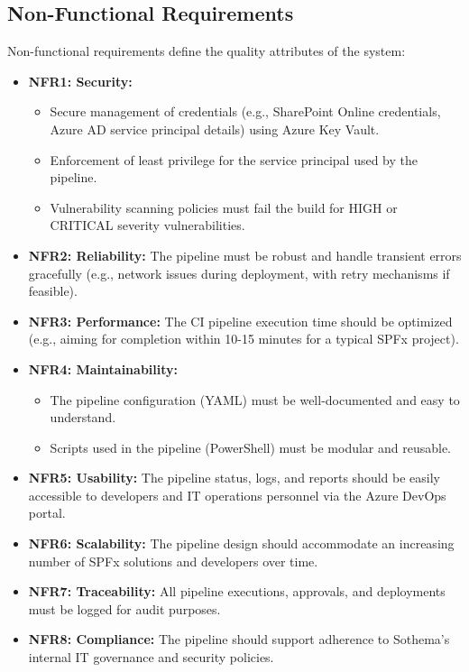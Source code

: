 \subsection{Non-Functional Requirements}
\label{subsec:NonFunctionalRequirements}

Non-functional requirements define the quality attributes of the system:
\begin{itemize}
    \item \textbf{NFR1: Security:}
    \begin{itemize}
        \item Secure management of credentials (e.g., SharePoint Online credentials, Azure AD service principal details) using Azure Key Vault.
        \item Enforcement of least privilege for the service principal used by the pipeline.
        \item Vulnerability scanning policies must fail the build for HIGH or CRITICAL severity vulnerabilities.
    \end{itemize}
    \item \textbf{NFR2: Reliability:} The pipeline must be robust and handle transient errors gracefully (e.g., network issues during deployment, with retry mechanisms if feasible).
    \item \textbf{NFR3: Performance:} The CI pipeline execution time should be optimized (e.g., aiming for completion within 10-15 minutes for a typical SPFx project).
    \item \textbf{NFR4: Maintainability:}
    \begin{itemize}
        \item The pipeline configuration (YAML) must be well-documented and easy to understand.
        \item Scripts used in the pipeline (PowerShell) must be modular and reusable.
    \end{itemize}
    \item \textbf{NFR5: Usability:} The pipeline status, logs, and reports should be easily accessible to developers and IT operations personnel via the Azure DevOps portal.
    \item \textbf{NFR6: Scalability:} The pipeline design should accommodate an increasing number of SPFx solutions and developers over time.
    \item \textbf{NFR7: Traceability:} All pipeline executions, approvals, and deployments must be logged for audit purposes.
    \item \textbf{NFR8: Compliance:} The pipeline should support adherence to Sothema's internal IT governance and security policies.
\end{itemize}

